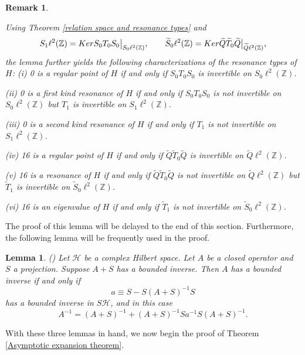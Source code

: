 \documentclass[10pt,a4paper]{amsart}
\newtheorem{lemma}[definition]{Lemma}
\newtheorem{remark}[definition]{Remark}
\newcommand\Z{\mathbb{Z}}
\newcommand\mscH{\mathcal{H}}
\numberwithin{equation}{section}
\begin{document}
\begin{remark}\label{remark of charac from inverti of operators}
{\rm Using Theorem \ref{relation space and resonance types} and 
$$S_1\ell^2(\Z)={\rm Ker}S_0T_0S_0\big|_{S_0\ell^2(\Z)},\qquad \widetilde{S}_0\ell^2(\Z)={\rm Ker}\widetilde{Q}\widetilde{T}_0\widetilde{Q}\big|_{\widetilde{Q}\ell^2(\Z)},$$
the lemma further yields the following characterizations of the resonance types of $H$:
\vskip0.1cm
(i) 0 is a regular point of $H$ if and only if $S_0T_0S_0$ is invertible on $S_0\ell^2(\Z)$.

(ii) 0 is a first kind resonance of $H$ if and only if $S_0T_0S_0$ is not invertible on $S_0\ell^2(\Z)$ but $T_1$ is invertible on $S_1\ell^2(\Z)$.

(iii) 0 is a second kind resonance of $H$ if and only if $T_1$ is not invertible on $S_1\ell^2(\Z)$.

(iv) 16 is a regular point of $H$ if and only if $\widetilde{Q}\widetilde{T}_0\widetilde{Q}$ is invertible on $\widetilde{Q}\ell^2(\Z)$.

(v) 16 is a resonance of $H$ if and only if $\widetilde{Q}\widetilde{T}_0\widetilde{Q}$ is not invertible on $\widetilde{Q}\ell^2(\Z)$ but $\widetilde{T}_1$ is invertible on $\widetilde{S}_0\ell^2(\Z)$.

(vi) 16 is an eigenvalue of $H$ if and only if $\widetilde{T}_1$ is not invertible on $\widetilde{S}_0\ell^2(\Z)$.
}
\end{remark}
The proof of this lemma will be delayed to the end of this section. Furthermore, the following lemma will be frequently used in the proof.
\begin{lemma}\label{lemm of expa}
{\rm (\cite[Lemma 2.1]{JN01})} Let $\mscH$ be a complex Hilbert space. Let $A$ be a closed operator and $S$ a projection. Suppose $A+S$ has a bounded inverse. Then $A$ has a bounded inverse if and only if
$$a\equiv S-S(A+S)^{-1}S$$
has a bounded inverse in $S\mscH$, and in this case
$$A^{-1}=(A+S)^{-1}+(A+S)^{-1}Sa^{-1}S(A+S)^{-1}.$$
\end{lemma}
With these three lemmas in hand, we now begin the proof of Theorem \ref{Asymptotic expansion theorem}.
\end{document}
